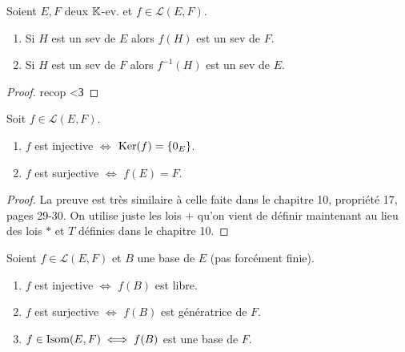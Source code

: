 \documentclass[12pt,a4paper]{report}
\begin{document}
\begin{property}
    Soient $E,F$ deux $\mathbb{K}$-ev. et $f \in \mathcal L(E,F)$.
    \begin{enumerate}
        \item Si $H$ est un sev de $E$ alors $f(H)$ est un sev de $F$.
        \item Si $H$ est un sev de $F$ alors $f^{-1}(H)$ est un sev de $E$.
    \end{enumerate}
\end{property}

\begin{proof}
    recop <З
\end{proof}

\begin{property}
    Soit $f \in \mathcal L(E,F)$.
    \begin{enumerate}
        \item $f$ est injective $\iff$ $\mathrm{Ker}(f) = \{0_E\}$.
        \item $f$ est surjective $\iff$ $f(E) = F$.
    \end{enumerate}
\end{property}

\begin{proof}
    La preuve est très similaire à celle faite dans le chapitre 10, propriété 17, pages 29-30. On utilise juste les lois $+$ qu'on vient de définir maintenant au lieu des lois $*$ et $T$ définies dans le chapitre 10.
\end{proof}

\begin{property}
    Soient $f \in \mathcal L(E,F)$ et $B$ une base de $E$ (pas forcément finie).

    \begin{enumerate}
        \item $f$ est injective $\iff$ $f(B)$ est libre.
        \item $f$ est surjective $\iff$ $f(B)$ est génératrice de $F$.
        \item $f \in \mathrm{Isom}(E,F) \iff f(B)$ est une base de $F$.
    \end{enumerate}
\end{property}
\end{document}
